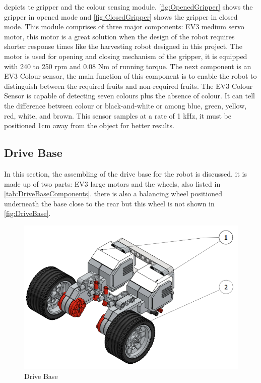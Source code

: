 \noindent {} depicts te gripper and the colour sensing module. \vref{fig:OpenedGripper} shows the gripper in opened mode and \vref{fig:ClosedGripper} shows the gripper in closed mode. This module comprises of three major components: EV3 medium servo motor, this motor is a great solution when the design of the robot requires shorter response times like the harvesting robot designed in this project. The motor is used for opening and closing mechanism of the gripper, it is equipped with 240 to 250 rpm and 0.08 Nm of running torque. The next component is an EV3 Colour sensor, the main function of this component is to enable the robot to distinguish between the required fruits and non-required fruits. The EV3 Colour Sensor is capable of detecting seven colours plus the absence of colour. It can tell the difference between colour or black-and-white or among blue, green, yellow, red, white, and brown. This sensor samples at a rate of 1 kHz, it must be positioned 1cm away from the object for better results.

\subsection{Drive Base}\label{sec:DriveBase}

\noindent In this section, the assembling of the drive base for the robot is discussed. it is made up of two parts: EV3 large motors and the wheels, also listed in \vref{tab:DriveBaseComponents}. there is also a balancing wheel positioned underneath the base close to the rear but this wheel is not shown in \vref{fig:DriveBase}.

\begin{figure}[!ht]
	\centering
	\includegraphics[width=\linewidth]{Graphics/DriveBase}
	\caption{Drive Base}
	\label{fig:DriveBase}
\end{figure}

